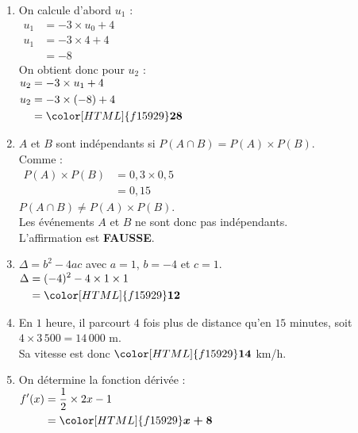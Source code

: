 \documentclass[a4paper,11pt,landscape,exos]{nsi} %
\begin{document}
\begin{multicols}{2}
\begin{enumerate}[itemsep=1em]
    \item On calcule d'abord $u_1$ : \\   
          $\begin{aligned}
          u_1&=-3\times u_0 +4\\
          u_1&=-3\times 4 +4\\
          &=-8     
          \end{aligned}$\\
          On obtient donc pour $u_2$ :\\
          $\begin{aligned}
          u_2&=-3\times u_1 +4\\
          u_2&=-3\times (-8) +4\\
          &={\color[HTML]{f15929}\boldsymbol{28}}     
          \end{aligned}$
    \item $A$ et $B$ sont indépendants si $P(A\cap B)=P(A)\times P(B)$.\\
        Comme :\\$\begin{aligned}
        P(A)\times P(B)&=0{,}3\times 0{,}5\\
        &=0{,}15
        \end{aligned}$\\ $P(A\cap B)\neq P(A)\times P(B)$.\\Les événements $A$ et $B$ ne sont donc pas indépendants.\\L'affirmation est {\bfseries \color[HTML]{f15929}FAUSSE}.
    \item  $\Delta=b^2-4ac$ avec $a=1$, $b=-4$ et $c=1$.\\
          $\begin{aligned}
          \Delta&=(-4)^2-4\times 1\times 1 \\
          &={\color[HTML]{f15929}\boldsymbol{12}} 
          \end{aligned}$
\vfill\null
\columnbreak
    \item En $1$ heure, il parcourt $4$ fois plus de distance  qu'en $15$ minutes, soit $4\times 3\,500=
          14\,000$ m.\\
          Sa vitesse est donc ${\color[HTML]{f15929}\boldsymbol{14}}$ km/h.
    \item  On détermine la fonction dérivée :\\
          $\begin{aligned}
          f'(x)&=\dfrac{1}{2}\times 2x -1\\
          &={\color[HTML]{f15929}\boldsymbol{x+8}}     
          \end{aligned}$
    

\end{enumerate}
\end{multicols}
\end{document}

